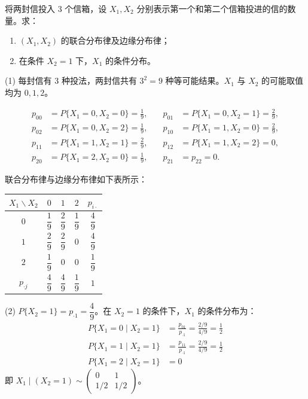﻿\documentclass[lang=cn,11pt]{elegantbook}
\begin{document}
\begin{exercise}\label{exer:3-2}
将两封信投入 3 个信箱，设 $X_1, X_2$ 分别表示第一个和第二个信箱投进的信的数量。求：
\begin{enumerate}
    \item[(1)] $(X_1, X_2)$ 的联合分布律及边缘分布律；
    \item[(2)] 在条件 $X_2 = 1$ 下，$X_1$ 的条件分布。
\end{enumerate}
\end{exercise}

\begin{solution}
(1) 每封信有 3 种投法，两封信共有 $3^2 = 9$ 种等可能结果。$X_1$ 与 $X_2$ 的可能取值均为 $0, 1, 2$。

\[
\begin{aligned}
p_{00} &= P\{X_1=0, X_2=0\} = \frac{1}{9}, &\quad p_{01} &= P\{X_1=0, X_2=1\} = \frac{2}{9}, \\
p_{02} &= P\{X_1=0, X_2=2\} = \frac{1}{9}, &\quad p_{10} &= P\{X_1=1, X_2=0\} = \frac{2}{9}, \\
p_{11} &= P\{X_1=1, X_2=1\} = \frac{2}{9}, &\quad p_{12} &= P\{X_1=1, X_2=2\} = 0, \\
p_{20} &= P\{X_1=2, X_2=0\} = \frac{1}{9}, &\quad p_{21} &= p_{22} = 0.
\end{aligned}
\]

联合分布律与边缘分布律如下表所示：

\begin{center}
\begin{tabular}{c|ccc|c}
\toprule
$X_1 \backslash X_2$ & $0$ & $1$ & $2$ & $p_{i\cdot}$ \\
\midrule
$0$ & $\dfrac{1}{9}$ & $\dfrac{2}{9}$ & $\dfrac{1}{9}$ & $\dfrac{4}{9}$ \\[6pt]
$1$ & $\dfrac{2}{9}$ & $\dfrac{2}{9}$ & $0$ & $\dfrac{4}{9}$ \\[6pt]
$2$ & $\dfrac{1}{9}$ & $0$ & $0$ & $\dfrac{1}{9}$ \\
\midrule
$p_{\cdot j}$ & $\dfrac{4}{9}$ & $\dfrac{4}{9}$ & $\dfrac{1}{9}$ & $1$ \\
\bottomrule
\end{tabular}
\end{center}

(2) $P\{X_2=1\} = p_{\cdot 1} = \dfrac{4}{9}$。在 $X_2 = 1$ 的条件下，$X_1$ 的条件分布为：
\begin{align*}
P\{X_1=0 \mid X_2=1\} &= \frac{p_{01}}{p_{\cdot 1}} = \frac{2/9}{4/9} = \frac{1}{2}\\
P\{X_1=1 \mid X_2=1\} &= \frac{p_{11}}{p_{\cdot 1}} = \frac{2/9}{4/9} = \frac{1}{2}\\
P\{X_1=2 \mid X_2=1\} &= 0
\end{align*}
即 $X_1 \mid (X_2=1) \sim \begin{pmatrix} 0 & 1 \\ 1/2 & 1/2 \end{pmatrix}$。
\end{solution}
\end{document}
